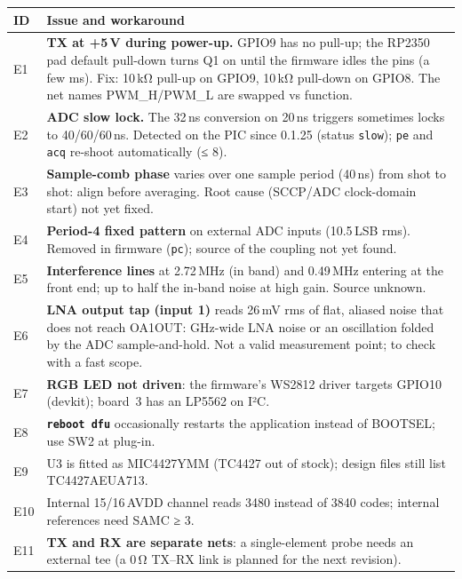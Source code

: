 \documentclass[10pt,a4paper]{article}
\newcommand{\cmd}[1]{\texttt{#1}}
\begin{document}
\begin{tabularx}{\linewidth}{@{}lX@{}}\toprule
\textbf{ID} & \textbf{Issue and workaround}\\\midrule
E1 & \textbf{TX at +5\,V during power-up.} GPIO9 has no pull-up; the RP2350 pad default pull-down turns Q1 on until the firmware idles the pins (a few ms). Fix: 10\,kΩ pull-up on GPIO9, 10\,kΩ pull-down on GPIO8. The net names PWM\_H/PWM\_L are swapped vs function.\\
E2 & \textbf{ADC slow lock.} The 32\,ns conversion on 20\,ns triggers sometimes locks to 40/60/60\,ns. Detected on the PIC since 0.1.25 (status \cmd{slow}); \cmd{pe} and \cmd{acq} re-shoot automatically (≤ 8).\\
E3 & \textbf{Sample-comb phase} varies over one sample period (40\,ns) from shot to shot: align before averaging. Root cause (SCCP/ADC clock-domain start) not yet fixed.\\
E4 & \textbf{Period-4 fixed pattern} on external ADC inputs (10.5\,LSB rms). Removed in firmware (\cmd{pc}); source of the coupling not yet found.\\
E5 & \textbf{Interference lines} at 2.72\,MHz (in band) and 0.49\,MHz entering at the front end; up to half the in-band noise at high gain. Source unknown.\\
E6 & \textbf{LNA output tap (input 1)} reads 26\,mV rms of flat, aliased noise that does not reach OA1OUT: GHz-wide LNA noise or an oscillation folded by the ADC sample-and-hold. Not a valid measurement point; to check with a fast scope.\\
E7 & \textbf{RGB LED not driven}: the firmware's WS2812 driver targets GPIO10 (devkit); board~3 has an LP5562 on I²C.\\
E8 & \textbf{\cmd{reboot dfu}} occasionally restarts the application instead of BOOTSEL; use SW2 at plug-in.\\
E9 & U3 is fitted as MIC4427YMM (TC4427 out of stock); design files still list TC4427AEUA713.\\
E10 & Internal 15/16\,AVDD channel reads 3480 instead of 3840 codes; internal references need SAMC ≥ 3.\\
E11 & \textbf{TX and RX are separate nets}: a single-element probe needs an external tee (a 0\,Ω TX–RX link is planned for the next revision).\\\bottomrule
\end{tabularx}
\normalsize

\end{document}
